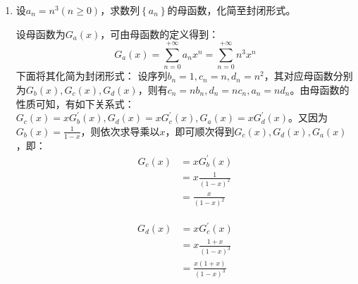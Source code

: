 \documentclass[a4paper]{article}
\begin{document}
\courseheader
\name{***}

\begin{enumerate}
  \setlength{\itemsep}{3\parskip}
  \item 设$a_n=n^3(n\geqslant 0)$，求数列$\left\{a_n\right\}$的母函数，化简至封闭形式。
  \begin{solution}
    设母函数为$G_a(x)$，可由母函数的定义得到：
    $$G_a(x) = \sum\limits_{n=0}^{+\infty }a_nx^n=\sum\limits_{n=0}^{+\infty}n^3x^n$$
    下面将其化简为封闭形式：
    设序列$b_n = 1,c_n = n, d_n = n^2$，其对应母函数分别为$G_b(x),G_c(x), G_d(x)$，则有$c_n=nb_n, d_n=nc_n, a_n=nd_n$。由母函数的性质可知，有如下关系式：$G_c(x)=xG_b^\prime(x), G_d(x)=xG_c^\prime(x),G_a(x)=xG_d^\prime(x)$。又因为$G_b(x)=\frac{1}{1-x}$，则依次求导乘以$x$，即可顺次得到$G_c(x),G_d(x), G_a(x)$，即：
    \begin{equation}
    \begin{aligned}
    G_c(x)&=xG_b^\prime(x)\\
    &=x\frac{1}{(1-x)^2}\\
    &=\frac{x}{(1-x)^2}
    \end{aligned}
    \end{equation}

    \begin{equation}
        \begin{aligned}
        G_d(x)&=xG_c^\prime(x)\\
        &=x\frac{1+x}{(1-x)^3}\\
        &=\frac{x(1+x)}{(1-x)^3}
        \end{aligned}
    \end{equation}


\end{solution}
\end{enumerate}
\end{document}
